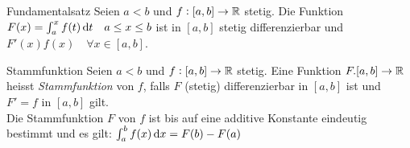 
\begin{theorem}{Fundamentalsatz}
	Seien $a<b$ und $f:[a,b] \to \mathbb{R}$ stetig.
	Die Funktion $F(x) = \int_{a}^{x} f(t) \dif t \quad a \leq x \leq b$ ist in $[a,b]$ stetig differenzierbar und $F'(x) f(x) \quad \forall x \in [a,b]$.
\end{theorem}
\begin{definition}{Stammfunktion}
	Seien $a<b$ und $f:[a,b] \to \mathbb{R}$ stetig.
	Eine Funktion $F. [a,b] \to \mathbb{R}$ heisst \emph{Stammfunktion} von $f$, falls $F$ (stetig) differenzierbar in $[a,b]$ ist und $F' = f$ in $[a,b]$ gilt.\\
    Die Stammfunktion $F$ von $f$ ist bis auf eine additive Konstante eindeutig bestimmt und es gilt:
    $\int_{a}^{b} f(x) \dif x = F(b) - F(a)$
\end{definition}










